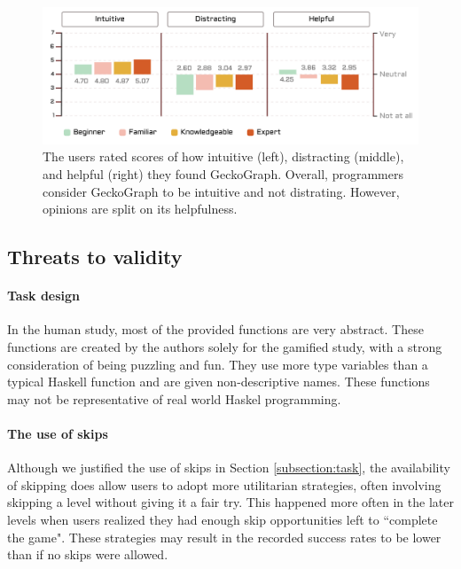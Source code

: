 \begin{figure}[hbt]
  \includegraphics[width=\linewidth]{figures/Qualitative}
  \caption[The users rated scores of how intuitive (left), distracting (middle), and helpful (right) they found GeckoGraph]{\label{fig:qualitative} The users rated scores of how intuitive (left), distracting (middle), and helpful (right) they found GeckoGraph. Overall, programmers consider GeckoGraph to be intuitive and not distrating. However, opinions are split on its helpfulness. }
\end{figure}



\subsection{Threats to validity}

\paragraph{Task design}
In the human study, most of the provided functions are very abstract. These functions are created by the authors solely for the gamified study, with a strong consideration of being puzzling and fun. They use more type variables than a typical Haskell function and are given non-descriptive names. These functions may not be representative of real world Haskel programming. 


\paragraph{The use of skips}
Although we justified the use of skips in Section \ref{subsection:task}, the availability of skipping does allow users to adopt more utilitarian strategies, often involving skipping a level without giving it a fair try. This happened more often in the later levels when users realized they had enough skip opportunities left to ``complete the game". These strategies may result in the recorded success rates to be lower than if no skips were allowed.



